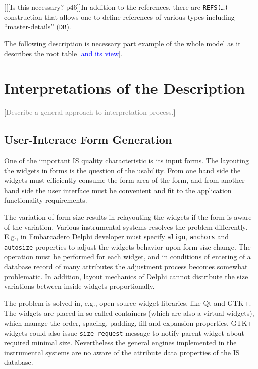 \documentclass[conference]{IEEEtran}
\newcommand{\e}[2][fcolor]{\textcolor{pcolor}{[}\textcolor{#1}{#2}\textcolor{pcolor}{]}}
\begin{document}
\e{[[Is this necessary? p46]]In addition to the references, there are \texttt{REFS(\ldots)} construction that allows one to define references of various types including ``master-details'' (\texttt{DR}).}

The following description is necessary part example of the whole model as it describes the root table \e[blue]{and its view}.











\section{Interpretations of the Description}
\label{sec:interpr-descr}

\e[gray]{Describe a general approach to interpretation process.}

\subsection{User-Interace Form Generation}
\label{sec:user-interace-form}
One of the important IS quality characteristic is its input forms.  The layouting the widgets in forms is the question of the usability.  From one hand side the widgets must efficiently consume the form area of the form, and from another hand side the user interface must be convenient and fit to the application functionality requirements.

The variation of form size results in relayouting the widgets if the form is aware of the variation.  Various instrumental systems resolves the problem differently.  E.g., in Embarcadero Delphi developer must specify \texttt{align}, \texttt{anchors} and \texttt{autosize} properties to adjust the widgets behavior upon form size change.  The operation must be performed for each widget, and in conditions of entering of a database record of many attributes the adjustment process becomes somewhat problematic.  In addition, layout mechanics of Delphi cannot distribute the size variations between inside widgets proportionally.

The problem is solved in, e.g., open-source widget libraries, like Qt and GTK+.  The widgets are placed in so called containers (which are also a virtual widgets), which manage the order, spacing, padding, fill and expansion properties.  GTK+ widgets could also issue \texttt{size request} message to notify parent widget about required minimal size.  Nevertheless the general engines implemented in the instrumental systems are no aware of the attribute data properties of the IS database.
\end{document}
